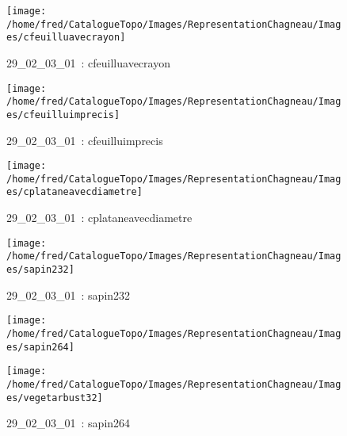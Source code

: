 \documentclass[12pt,titlepage]{book}
\begin{document}
\begin{figure}[h!]
\begin{minipage}[t]{3cm}
    \begin{center}
      \texttt{[image: /home/fred/CatalogueTopo/Images/RepresentationChagneau/Images/cfeuilluavecrayon]}
      \caption[~29\_02\_03\_01]{\small{29\_02\_03\_01~:} \tiny{cfeuilluavecrayon}}\label{cfeuilluavecrayon}
    \end{center}
  \end{minipage}
  \begin{minipage}[t]{3cm}
    \begin{center}
      \texttt{[image: /home/fred/CatalogueTopo/Images/RepresentationChagneau/Images/cfeuilluimprecis]}
      \caption[~29\_02\_03\_01]{\small{29\_02\_03\_01~:} \tiny{cfeuilluimprecis}}\label{cfeuilluimprecis}
    \end{center}
  \end{minipage}
  \begin{minipage}[t]{3cm}
    \begin{center}
      \texttt{[image: /home/fred/CatalogueTopo/Images/RepresentationChagneau/Images/cplataneavecdiametre]}
      \caption[~29\_02\_03\_01]{\small{29\_02\_03\_01~:} \tiny{cplataneavecdiametre}}\label{cplataneavecdiametre}
    \end{center}
  \end{minipage}
  \begin{minipage}[t]{3cm}
    \begin{center}
      \texttt{[image: /home/fred/CatalogueTopo/Images/RepresentationChagneau/Images/sapin232]}
      \caption[~29\_02\_03\_01]{\small{29\_02\_03\_01~:} \tiny{sapin232}}\label{sapin232}
    \end{center}
  \end{minipage}
  \begin{minipage}[t]{3cm}
    \begin{center}
      \texttt{[image: /home/fred/CatalogueTopo/Images/RepresentationChagneau/Images/sapin264]}
      \caption[~29\_02\_03\_01]{\small{29\_02\_03\_01~:} \tiny{sapin264}}\label{sapin264}
    \end{center}
  \end{minipage}
  \begin{minipage}[t]{3cm}
    \begin{center}
      \texttt{[image: /home/fred/CatalogueTopo/Images/RepresentationChagneau/Images/vegetarbust32]}

\end{center}
\end{minipage}
\end{figure}
\end{document}
